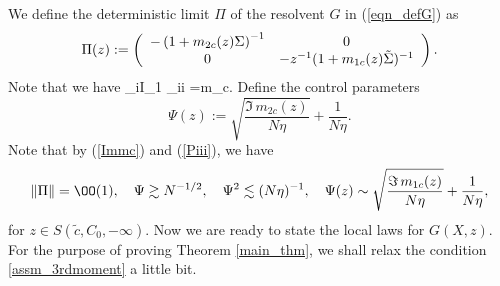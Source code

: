 
We define the deterministic limit $\Pi$ of the resolvent $G$ in (\ref{eqn_defG}) as
\begin{equation}\label{defn_pi}
\Pi (z): = \left( {\begin{array}{*{20}c}
   { -\left(1+m_{2c}(z)\Sigma \right)^{-1} } & 0  \\
   0 & { - z^{-1} (1+m_{1c}(z)\tilde \Sigma )^{-1} }  \\
\end{array}} \right) .
\end{equation}
Note that we have
\be\label{mcPi}
\sum_{i\in \mathcal I_1} \Pi_{ii} =m_c. 
\ee
Define the control parameters
\begin{equation}\label{eq_defpsi}
\Psi (z):= \sqrt {\frac{\Im \, m_{2c}(z)}{{N\eta }} } + \frac{1}{N\eta}.
\end{equation}
Note that by (\ref{Immc}) and (\ref{Piii}), we have
\begin{equation}\label{psi12}
\|\Pi\|=\OO(1), \quad \Psi \gtrsim N^{-1/2} , \quad \Psi^2 \lesssim (N\eta)^{-1}, \quad \Psi(z) \sim  \sqrt {\frac{\Im \, m_{1c}(z)}{{N\eta }} } + \frac{1}{N\eta},
\end{equation}
for $z\in S(\tilde c, C_0,-\infty)$. Now we are ready to state the local laws for $G(X,z)$. For the purpose of proving Theorem \ref{main_thm}, we shall relax the condition \eqref{assm_3rdmoment} a little bit. 




